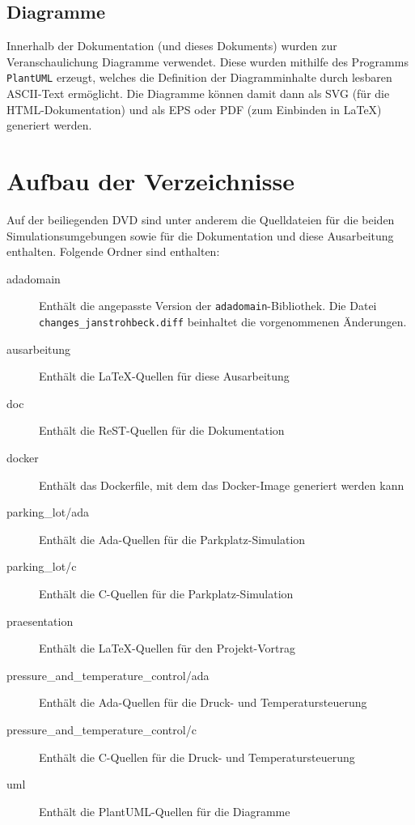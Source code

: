 \documentclass[oneside]{elaboration}
\begin{document}
\subsection{Diagramme}
\label{sec:diagramme}

Innerhalb der Dokumentation (und dieses Dokuments) wurden zur
Veranschaulichung Diagramme verwendet. Diese wurden mithilfe des Programms
\texttt{PlantUML} erzeugt, welches die Definition der Diagramminhalte durch
lesbaren ASCII-Text ermöglicht. Die Diagramme können damit dann als SVG (für die
HTML-Dokumentation) und als EPS oder PDF (zum Einbinden in LaTeX) generiert
werden.

\section{Aufbau der Verzeichnisse}
\label{sec:aufbau_der_verzeichnisse}

Auf der beiliegenden DVD sind unter anderem die Quelldateien für die beiden
Simulationsumgebungen sowie für die Dokumentation und diese Ausarbeitung
enthalten. Folgende Ordner sind enthalten:

\begin{description}
    \item[adadomain] Enthält die angepasste Version der
        \texttt{adadomain}-Bibliothek. Die Datei
        \texttt{changes\_janstrohbeck.diff} beinhaltet die vorgenommenen
        Änderungen.
    \item[ausarbeitung] Enthält die LaTeX-Quellen für diese Ausarbeitung
    \item[doc] Enthält die ReST-Quellen für die Dokumentation
    \item[docker] Enthält das Dockerfile, mit dem das Docker-Image generiert
        werden kann
    \item[parking\_lot/ada] Enthält die Ada-Quellen für die Parkplatz-Simulation
    \item[parking\_lot/c] Enthält die C-Quellen für die Parkplatz-Simulation
    \item[praesentation] Enthält die LaTeX-Quellen für den Projekt-Vortrag
    \item[pressure\_and\_temperature\_control/ada] Enthält die Ada-Quellen für die Druck- und Temperatursteuerung 
    \item[pressure\_and\_temperature\_control/c] Enthält die C-Quellen für die Druck- und Temperatursteuerung 
    \item[uml] Enthält die PlantUML-Quellen für die Diagramme
\end{description}
\end{document}

